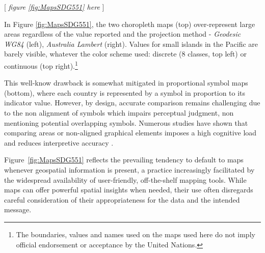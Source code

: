 \documentclass[11pt,twoside,a4paper]{article}
\begin{document}
\begin{center}
    [ \textit{figure \ref{fig:MapsSDG551}  here}  ]
\end{center}


In Figure \ref{fig:MapsSDG551}, the two choropleth maps (top) over-represent large areas regardless of the value reported and the projection method - \textit{Geodesic WG84} (left), \textit{Australia Lambert} (right). Values for small islands in the Pacific are barely visible, whatever the color scheme  used: discrete (8 classes, top left) or continuous (top right).\footnote{The boundaries, values and names used on the maps used here do not imply official endorsement or acceptance by the United Nations.}


This well-know drawback is somewhat mitigated in proportional symbol maps (bottom), where each country is represented by a symbol in proportion to its indicator value. However, by design,  accurate comparison remains challenging due to the non alignment of symbols which impairs perceptual judgment, non mentioning potential overlapping symbols. Numerous studies have shown that comparing areas or non-aligned graphical elements imposes a high cognitive load and reduces interpretive accuracy \citep{Cleveland1984, heer2010perception}. 



Figure~\ref{fig:MapsSDG551} reflects the prevailing tendency to default to maps whenever geospatial information is present, a practice increasingly facilitated by the widespread availability of user-friendly, off-the-shelf mapping tools. While maps can offer powerful spatial insights when needed, their use often disregards careful consideration of their appropriateness for the data and the intended message. 
\end{document}
